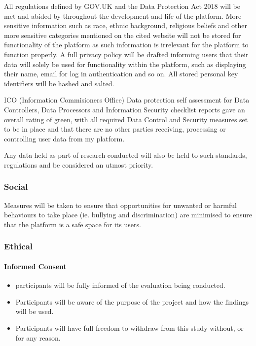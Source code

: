 \documentclass[lettersize,journal]{IEEEtran}
\begin{document}
	All regulations defined by GOV.UK and the Data Protection Act 2018 \cite{Gov UK Data Protection} will be met and abided by throughout
	the development and life of the platform. More sensitive information such as race, ethnic background, religious beliefs and other more
	sensitive categories mentioned on the cited website will not be stored for functionality of the platform as such information
	is irrelevant for the platform to function properly. A full privacy policy will be drafted informing users that their data will solely
	be used for functionality within the platform, such as displaying their name, email for log in authentication and so on. All stored
	personal key identifiers will be hashed	and salted.

	ICO (Information Commisioners Office) \cite{ICO} Data protection self assessment for Data Controllers, Data Processors and Information Security
	checklist reports gave an overall rating of green, with all required Data Control and Security measures set to be in place and that
	there are no other parties receiving, processing or controlling user data from my platform.

	Any data held as part of research conducted will also be held to such standards, regulations and be considered an utmost priority.
	
	\subsubsection{Social}
		Measures will be taken to ensure that opportunities for unwanted or harmful behaviours to take place (ie. bullying and discrimination) 
		are minimised to ensure that the platform is a safe space for its users.

	\subsubsection{Ethical}

		\paragraph{Informed Consent}

		\begin{itemize}
			\item participants will be fully informed of the evaluation being conducted.
			\item Participants will be aware of the purpose of the project and how the findings will be used.
			\item Participants will have full freedom to withdraw from this study without, or for any reason.
		\end{itemize}
\end{document}
